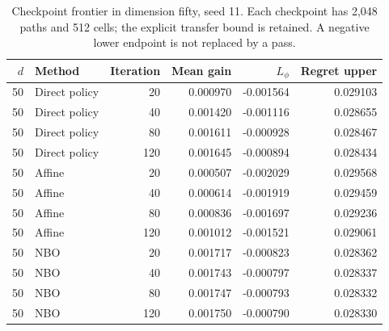 \begin{table}[htbp]\centering\small\setlength{\tabcolsep}{4pt}
\caption{Checkpoint frontier in dimension fifty, seed 11. Each checkpoint has 2,048 paths and 512 cells; the explicit transfer bound is retained. A negative lower endpoint is not replaced by a pass.}\label{tab:r11frontier}
\begin{tabular}{rlrrrr}\toprule
$d$ & Method & Iteration & Mean gain & $L_\phi$ & Regret upper\\\midrule
50 & Direct policy & 20 & 0.000970 & -0.001564 & 0.029103 \\
50 & Direct policy & 40 & 0.001420 & -0.001116 & 0.028655 \\
50 & Direct policy & 80 & 0.001611 & -0.000928 & 0.028467 \\
50 & Direct policy & 120 & 0.001645 & -0.000894 & 0.028434 \\
50 & Affine & 20 & 0.000507 & -0.002029 & 0.029568 \\
50 & Affine & 40 & 0.000614 & -0.001919 & 0.029459 \\
50 & Affine & 80 & 0.000836 & -0.001697 & 0.029236 \\
50 & Affine & 120 & 0.001012 & -0.001521 & 0.029061 \\
50 & NBO & 20 & 0.001717 & -0.000823 & 0.028362 \\
50 & NBO & 40 & 0.001743 & -0.000797 & 0.028337 \\
50 & NBO & 80 & 0.001747 & -0.000793 & 0.028332 \\
50 & NBO & 120 & 0.001750 & -0.000790 & 0.028330 \\
\bottomrule\end{tabular}\end{table}
